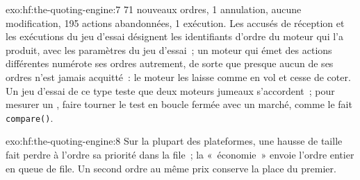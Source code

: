 \begin{solution}{exo:hf:the-quoting-engine:7}
71 nouveaux ordres, 1 annulation, aucune modification, 195 actions abandonnées, 1 exécution. Les accusés de réception et les exécutions du jeu d'essai désignent les identifiants
d'ordre du moteur qui l'a produit, avec les paramètres du jeu d'essai~; un moteur qui émet des actions différentes numérote ses ordres autrement, de sorte que presque aucun de ses ordres
n'est jamais acquitté~: le moteur les laisse comme en vol et cesse de coter. Un jeu d'essai de ce type teste que deux moteurs jumeaux s'accordent~; pour mesurer un
, faire tourner le test en boucle fermée avec un marché, comme le fait \texttt{compare()}.
\end{solution}

\begin{solution}{exo:hf:the-quoting-engine:8}
Sur la plupart des plateformes, une hausse de taille fait perdre à l'ordre sa priorité dans la file~; la «~économie~» envoie l'ordre entier en queue de file.
Un second ordre au même prix conserve la place du premier.
\end{solution}

